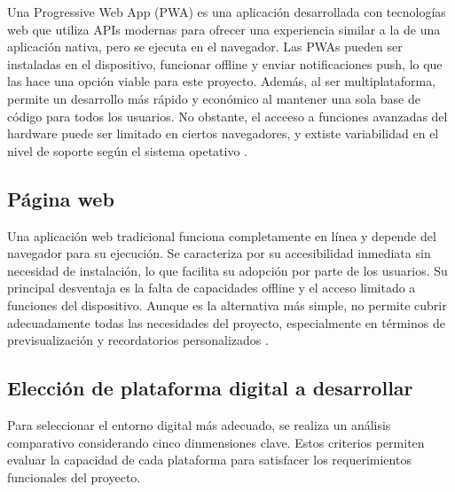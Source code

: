 Una Progressive Web App (PWA) es una aplicación desarrollada con tecnologías web que utiliza APIs modernas para ofrecer una experiencia similar a la de una aplicación nativa, pero se ejecuta en el navegador. Las PWAs pueden ser instaladas en el dispositivo, funcionar offline y enviar notificaciones push, lo que las hace una opción viable para este proyecto. Además, al ser multiplataforma, permite un desarrollo más rápido y económico al mantener una sola base de código para todos los usuarios. No obstante, el acceeso a funciones avanzadas del hardware puede ser limitado en ciertos navegadores, y extiste variabilidad en el nivel de soporte según el sistema opetativo \cite{fernandes2020}.

\subsection{Página web}

Una aplicación web tradicional funciona completamente en línea y depende del navegador para su ejecución. Se caracteriza por su accesibilidad inmediata sin necesidad de instalación, lo que facilita su adopción por parte de los usuarios. Su principal desventaja es la falta de capacidades offline y el acceso limitado a funciones del dispositivo. Aunque es la alternativa más simple, no permite cubrir adecuadamente todas las necesidades del proyecto, especialmente en términos de previsualización y recordatorios personalizados \cite{crovi2002}.

\subsection{Elección de plataforma digital a desarrollar}

Para seleccionar el entorno digital más adecuado, se realiza un análisis comparativo considerando cinco dinmensiones clave. Estos criterios permiten evaluar la capacidad de cada plataforma para satisfacer los requerimientos funcionales del proyecto.

